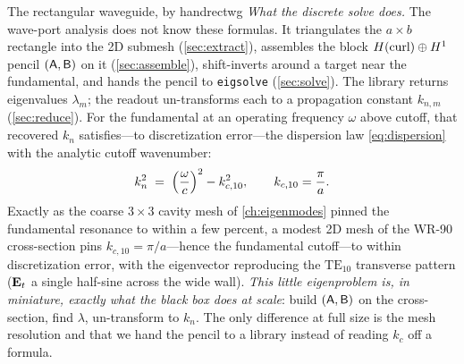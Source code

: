 \begin{workedexample}{The rectangular waveguide, by hand}{rectwg}
\emph{What the discrete solve does.} The wave-port analysis does not know these
formulas. It triangulates the $a\times b$ rectangle into the 2D submesh
(\cref{sec:extract}), assembles the block $H(\mathrm{curl})\oplus H^1$ pencil
$(\mathsf{A},\mathsf{B})$ on it (\cref{sec:assemble}), shift-inverts around a target near
the fundamental, and hands the pencil to \texttt{eigsolve} (\cref{sec:solve}). The
library returns eigenvalues $\lambda_m$; the readout un-transforms each to a
propagation constant $k_{n,m}$ (\cref{sec:reduce}). For the fundamental at an
operating frequency $\omega$ above cutoff, that recovered $k_n$ satisfies---to
discretization error---the dispersion law \eqref{eq:dispersion} with the analytic
cutoff wavenumber:
\[
  k_n^2 \;=\; \Bigl(\frac{\omega}{c}\Bigr)^2 - k_{c,10}^2,
  \qquad
  k_{c,10} = \frac{\pi}{a}.
\]
Exactly as the coarse $3\times3$ cavity mesh of \cref{ch:eigenmodes} pinned the
fundamental resonance to within a few percent, a modest 2D mesh of the WR-90
cross-section pins $k_{c,10}=\pi/a$---hence the fundamental cutoff---to within
discretization error, with the eigenvector reproducing the
$\mathrm{TE}_{10}$ transverse pattern ($\mathbf{E}_t$ a single half-sine across the wide
wall). \emph{This little eigenproblem is, in miniature, exactly what the black box
does at scale}: build $(\mathsf{A},\mathsf{B})$ on the cross-section, find $\lambda$,
un-transform to $k_n$. The only difference at full size is the mesh resolution and
that we hand the pencil to a library instead of reading $k_c$ off a formula.
\end{workedexample}

